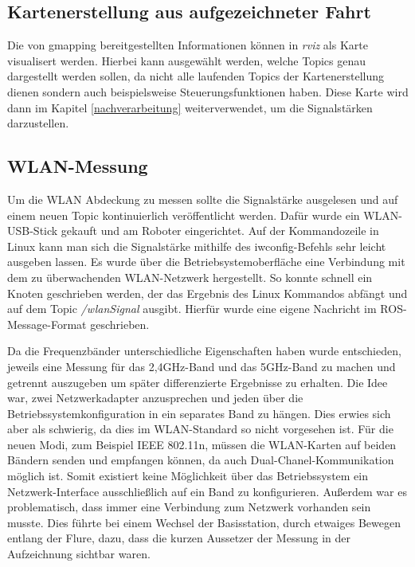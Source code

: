 \documentclass{scrartcl}%
\begin{document}
\subsection{Kartenerstellung aus aufgezeichneter Fahrt}
Die von gmapping bereitgestellten Informationen können in \textit{rviz} als Karte visualisert werden. Hierbei kann ausgewählt werden, welche Topics genau dargestellt werden sollen, da nicht alle laufenden Topics der Kartenerstellung dienen sondern auch beispielsweise Steuerungsfunktionen haben. Diese Karte wird dann im Kapitel \ref{nachverarbeitung} weiterverwendet, um die Signalstärken darzustellen.

\subsection{WLAN-Messung}
Um die WLAN Abdeckung zu messen sollte die Signalstärke ausgelesen und auf einem neuen Topic kontinuierlich veröffentlicht werden. Dafür wurde ein WLAN-USB-Stick gekauft und am Roboter eingerichtet. Auf der Kommandozeile in Linux kann man sich die Signalstärke mithilfe des iwconfig-Befehls sehr leicht ausgeben lassen. Es wurde über die Betriebsystemoberfläche eine Verbindung mit dem zu überwachenden WLAN-Netzwerk hergestellt. So konnte schnell ein Knoten geschrieben werden, der das Ergebnis des Linux Kommandos abfängt und auf dem Topic \textit{/wlanSignal} ausgibt. Hierfür wurde eine eigene Nachricht im ROS-Message-Format geschrieben.

Da die Frequenzbänder unterschiedliche Eigenschaften haben wurde entschieden, jeweils eine Messung für das 2,4GHz-Band und das 5GHz-Band zu machen und getrennt auszugeben um später differenzierte Ergebnisse zu erhalten. Die Idee war, zwei Netzwerkadapter anzusprechen und jeden über die Betriebssystemkonfiguration in ein separates Band zu hängen. Dies erwies sich aber als schwierig, da dies im WLAN-Standard so nicht vorgesehen ist. Für die neuen Modi, zum Beispiel IEEE 802.11n, müssen die WLAN-Karten auf beiden Bändern senden und empfangen können, da auch Dual-Chanel-Kommunikation möglich ist. Somit existiert keine Möglichkeit über das Betriebssystem ein Netzwerk-Interface ausschließlich auf ein Band zu konfigurieren. Außerdem war es problematisch, dass immer eine Verbindung zum Netzwerk vorhanden sein musste. Dies führte bei einem Wechsel der Basisstation, durch etwaiges Bewegen entlang der Flure, dazu, dass die kurzen Aussetzer der Messung in der Aufzeichnung sichtbar waren. 
\end{document}
